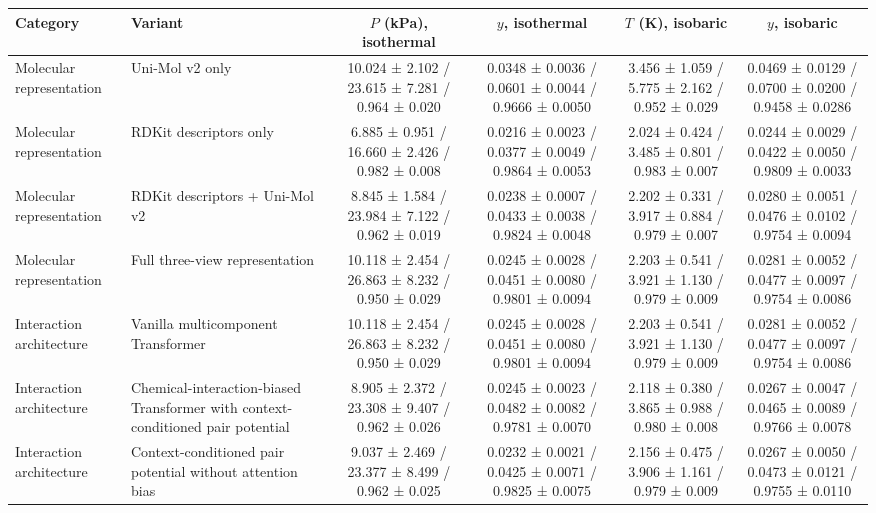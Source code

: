 \begin{tabular}{llcccc}
\toprule
Category & Variant & $P$ (kPa), isothermal & $y$, isothermal & $T$ (K), isobaric & $y$, isobaric \\
\midrule
Molecular representation & Uni-Mol v2 only & 10.024 ± 2.102 / 23.615 ± 7.281 / 0.964 ± 0.020 & 0.0348 ± 0.0036 / 0.0601 ± 0.0044 / 0.9666 ± 0.0050 & 3.456 ± 1.059 / 5.775 ± 2.162 / 0.952 ± 0.029 & 0.0469 ± 0.0129 / 0.0700 ± 0.0200 / 0.9458 ± 0.0286 \\
Molecular representation & RDKit descriptors only & 6.885 ± 0.951 / 16.660 ± 2.426 / 0.982 ± 0.008 & 0.0216 ± 0.0023 / 0.0377 ± 0.0049 / 0.9864 ± 0.0053 & 2.024 ± 0.424 / 3.485 ± 0.801 / 0.983 ± 0.007 & 0.0244 ± 0.0029 / 0.0422 ± 0.0050 / 0.9809 ± 0.0033 \\
Molecular representation & RDKit descriptors + Uni-Mol v2 & 8.845 ± 1.584 / 23.984 ± 7.122 / 0.962 ± 0.019 & 0.0238 ± 0.0007 / 0.0433 ± 0.0038 / 0.9824 ± 0.0048 & 2.202 ± 0.331 / 3.917 ± 0.884 / 0.979 ± 0.007 & 0.0280 ± 0.0051 / 0.0476 ± 0.0102 / 0.9754 ± 0.0094 \\
Molecular representation & Full three-view representation & 10.118 ± 2.454 / 26.863 ± 8.232 / 0.950 ± 0.029 & 0.0245 ± 0.0028 / 0.0451 ± 0.0080 / 0.9801 ± 0.0094 & 2.203 ± 0.541 / 3.921 ± 1.130 / 0.979 ± 0.009 & 0.0281 ± 0.0052 / 0.0477 ± 0.0097 / 0.9754 ± 0.0086 \\
Interaction architecture & Vanilla multicomponent Transformer & 10.118 ± 2.454 / 26.863 ± 8.232 / 0.950 ± 0.029 & 0.0245 ± 0.0028 / 0.0451 ± 0.0080 / 0.9801 ± 0.0094 & 2.203 ± 0.541 / 3.921 ± 1.130 / 0.979 ± 0.009 & 0.0281 ± 0.0052 / 0.0477 ± 0.0097 / 0.9754 ± 0.0086 \\
Interaction architecture & Chemical-interaction-biased Transformer with context-conditioned pair potential & 8.905 ± 2.372 / 23.308 ± 9.407 / 0.962 ± 0.026 & 0.0245 ± 0.0023 / 0.0482 ± 0.0082 / 0.9781 ± 0.0070 & 2.118 ± 0.380 / 3.865 ± 0.988 / 0.980 ± 0.008 & 0.0267 ± 0.0047 / 0.0465 ± 0.0089 / 0.9766 ± 0.0078 \\
Interaction architecture & Context-conditioned pair potential without attention bias & 9.037 ± 2.469 / 23.377 ± 8.499 / 0.962 ± 0.025 & 0.0232 ± 0.0021 / 0.0425 ± 0.0071 / 0.9825 ± 0.0075 & 2.156 ± 0.475 / 3.906 ± 1.161 / 0.979 ± 0.009 & 0.0267 ± 0.0050 / 0.0473 ± 0.0121 / 0.9755 ± 0.0110 \\
\bottomrule
\end{tabular}
